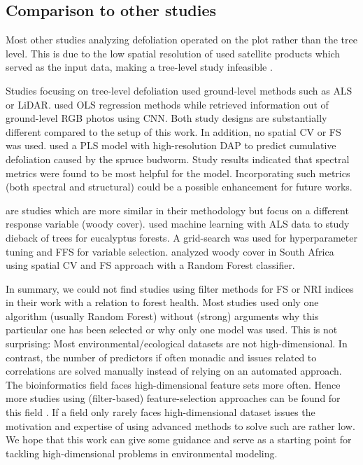 \documentclass[letterpaper, peerreview]{IEEEtran}
\begin{document}
\subsection{Comparison to other studies}

\noindent Most other studies analyzing defoliation operated on the plot rather than the tree level.
This is due to the low spatial resolution of used satellite products which served as the input data, making a tree-level study infeasible \cite{townsend2012, debeurs2008, rengarajan2016}.

Studies focusing on tree-level defoliation used ground-level methods such as \ac{ALS} or \ac{LiDAR}\cite{meng2018, kalin2019}.
\cite{meng2018} used \ac{OLS} regression methods while\cite{kalin2019} retrieved information out of ground-level RGB photos using \ac{CNN}.
Both study designs are substantially different compared to the setup of this work.
In addition, no spatial \ac{CV} or \ac{FS} was used.
\cite{goodbody2018} used a \ac{PLS} model with high-resolution \ac{DAP} to predict cumulative defoliation caused by the spruce budworm.
Study results indicated that spectral metrics were found to be most helpful for the model.
Incorporating such metrics (both spectral and structural) could be a possible enhancement for future works.

\cite{shendryk2016, ludwig2019} are studies which are more similar in their methodology but focus on a different response variable (woody cover).
\cite{shendryk2016} used machine learning with \ac{ALS} data to study dieback of trees for eucalyptus forests.
A grid-search was used for hyperparameter tuning and \ac{FFS} for variable selection.
\cite{ludwig2019} analyzed woody cover in South Africa using spatial \ac{CV} and \ac{FS} approach \cite{meyer2018} with a Random Forest classifier.

In summary, we could not find studies using filter methods for \ac{FS} or \ac{NRI} indices in their work with a relation to forest health.
Most studies used only one algorithm (usually Random Forest) without (strong) arguments why this particular one has been selected or why only one model was used.
This is not surprising: Most environmental/ecological datasets are not high-dimensional.
In contrast, the number of predictors if often monadic and issues related to correlations are solved manually instead of relying on an automated approach.
The bioinformatics field faces high-dimensional feature sets more often.
Hence more studies using (filter-based) feature-selection approaches can be found for this field \cite{guo2019, radovic2017}.
If a field only rarely faces high-dimensional dataset issues the motivation and expertise of using advanced methods to solve such are rather low.
We hope that this work can give some guidance and serve as a starting point for tackling high-dimensional problems in environmental modeling.
\end{document}
